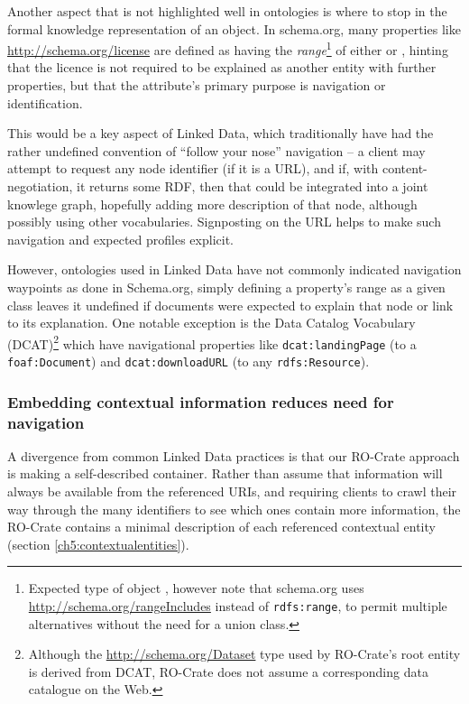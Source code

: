 Another aspect that is not highlighted well in ontologies is where to stop in the formal knowledge representation of an object.
In schema.org, many properties like \url{http://schema.org/license} are defined as having the \emph{range}\footnote{Expected type of object \cite{w3-rdf-schema}, however note that schema.org uses \url{http://schema.org/rangeIncludes} instead of \texttt{rdfs:range}, to permit multiple alternatives without the need for a union class.} of either  or , hinting that the licence is not required to be explained as another entity with further properties, but that the attribute's primary purpose is navigation or identification. 

This would be a key aspect of Linked Data, which traditionally have had the rather undefined convention of ``follow your nose'' navigation -- a client may attempt to request any node identifier (if it is a URL), and if, with content-negotiation, it returns some RDF, then that could be integrated into a joint knowlege graph, hopefully adding more description of that node, although possibly using other vocabularies.
Signposting on the URL helps to make such navigation and expected profiles explicit.

However, ontologies used in Linked Data have not commonly indicated navigation waypoints as done in Schema.org, simply defining a property's range as a given class leaves it undefined if documents were expected to explain that node or link to its explanation. One notable exception is the Data Catalog Vocabulary (DCAT)\footnote{Although the \url{http://schema.org/Dataset} type used by RO-Crate's root entity is derived from DCAT, RO-Crate does not assume a corresponding data catalogue on the Web.} \cite{DCAT2 2020} which have navigational properties like \texttt{dcat:landingPage} (to a \texttt{foaf:Document}) and \texttt{dcat:downloadURL} (to any \texttt{rdfs:Resource}).


\subsubsection{Embedding contextual information reduces need for navigation}
\label{ch61:contextual}

A divergence from common Linked Data practices is that our RO-Crate approach is making a self-described container.
Rather than assume that information will always be available from the referenced URIs, and requiring clients to crawl their way through the many identifiers to see which ones contain more information, the RO-Crate contains a minimal description of each referenced contextual entity (section \vref{ch5:contextualentities}). 

